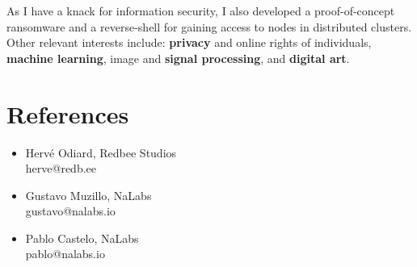 \documentclass{vitae}
\begin{document}
As I have a knack for information security, I also developed a proof-of-concept ransomware and a reverse-shell for gaining access to nodes in distributed clusters.
Other relevant interests include: {\bf privacy} and online rights of individuals, {\bf machine learning}, image and {\bf signal processing}, and {\bf digital art}.

\section*{References}
\begin{itemize}
    \item Hervé Odiard, Redbee Studios\\
    herve@redb.ee
    \item Gustavo Muzillo, NaLabs\\
    gustavo@nalabs.io
    \item Pablo Castelo, NaLabs\\
    pablo@nalabs.io
\end{itemize}
\end{document}
